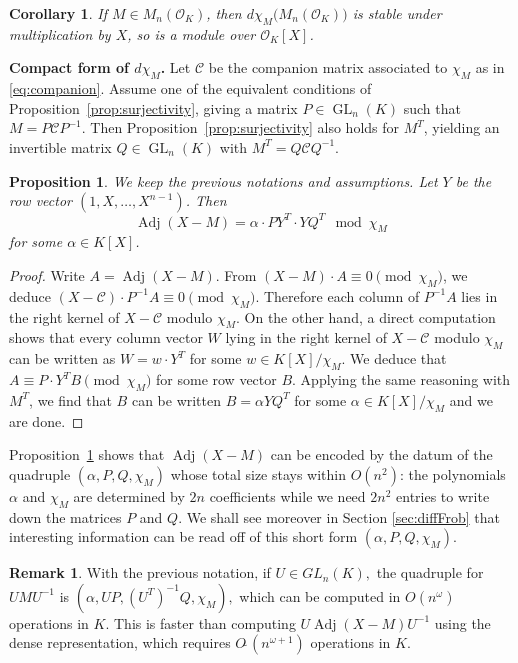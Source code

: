 \documentclass[sigconf]{acmart}
\DeclareMathOperator{\GL}{GL}
\DeclareMathOperator{\adj}{Adj}
\newcommand{\OK}{\mathcal{O}_K}
\newcommand{\softO}{O\tilde{~}}
\newtheorem{prop}[theo]{Proposition}
\newtheorem{cor}[theo]{Corollary}
\theoremstyle{definition}
\newtheorem{rem}[theo]{Remark}
\begin{document}
\begin{cor}
If $M \in M_n(\OK)$, then $d \chi_M \big(M_n(\OK)\big)$ 
is stable under multiplication by $X$, so is a module over $\OK[X]$.
\end{cor}

\medskip

\noindent
{\bf Compact form of $d \chi_M$.}
Let $\mathscr{C}$ be the companion matrix associated to $\chi_M$ as in \eqref{eq:companion}.
Assume one of the equivalent conditions of Proposition~\ref{prop:surjectivity}, giving a matrix 
$P \in \GL_n(K)$ such that $M = P \mathscr{C} P^{-1}$. Then Proposition~\ref{prop:surjectivity}
also holds for $M^T$, yielding an
invertible matrix $Q \in \GL_n(K)$ with $M^T = Q \mathscr{C} Q^{-1}$.

\begin{prop}
\label{prop:shortcom}
We keep the previous notations and assumptions.
Let $Y$ be the row vector $(1, X, \ldots, X^{n-1})$. Then
\begin{equation}
\label{eq:shortcom}
\adj(X{-}M) = \alpha \cdot P Y^T \cdot Y Q^T
\mod \chi_M
\end{equation}
for some $\alpha \in K[X]$.
\end{prop}

\begin{proof}
Write $A = \adj(X{-}M)$. From $(X{-}M) \cdot A \equiv 0 
\pmod{\chi_M}$, we deduce $(X{-}\mathscr{C}) \cdot P^{-1} A \equiv 0 \pmod{\chi_M}$. 
Therefore each column of $P^{-1} A$ lies in the right kernel of $X{-}\mathscr{C}$
modulo $\chi_M$. On the other hand, a direct computation shows that
every column vector $W$ lying in the right kernel of $X{-}\mathscr{C}$ modulo 
$\chi_M$ can be written as $W = w \cdot Y^T$ for some $w \in 
K[X]/\chi_M$. We deduce that $A \equiv P \cdot Y^T B \pmod{\chi_M}$
for some row vector $B$.
Applying the same reasoning with $M^T$, we find that $B$ can be
written $B = \alpha Y Q^T$ for some $\alpha \in K[X]/\chi_M$ and
we are done.
\end{proof}

Proposition~\ref{prop:shortcom} shows that $\adj(X{-}M)$ can be encoded 
by the datum of the quadruple $(\alpha, P, Q, \chi_M)$ whose total size 
stays within $O(n^2)$: the polynomials $\alpha$ and $\chi_M$ are 
determined by $2n$ coefficients while we need $2n^2$ entries to 
write down the matrices $P$ and $Q$. 
We shall see moreover in Section \ref{sec:diffFrob} that interesting
information can be read off of this short form $(\alpha, P, Q, 
\chi_M)$.

\begin{rem}
With the previous notation, if $U \in GL_n(K),$
the quadruple for 
$UMU^{-1}$ is
$(\alpha, UP, (U^T)^{-1}Q, \chi_M),$
which can be computed in $O(n^\omega)$ operations in $K.$
This is faster than computing $U \adj(X-M) U^{-1}$ using the dense
representation, which requires $\softO(n^{\omega+1})$ operations in $K.$
\end{rem}
\end{document}
